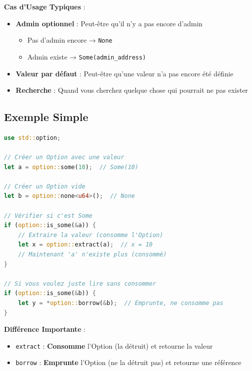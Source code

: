 \documentclass[11pt]{article}
\begin{document}
\begin{explainBox}
\textbf{Cas d'Usage Typiques} :
\begin{itemize}
  \item \textbf{Admin optionnel} : Peut-être qu'il n'y a pas encore d'admin
  \begin{itemize}
    \item Pas d'admin encore → \texttt{None}
    \item Admin existe → \texttt{Some(admin\_address)}
  \end{itemize}
  
  \item \textbf{Valeur par défaut} : Peut-être qu'une valeur n'a pas encore été définie
  \item \textbf{Recherche} : Quand vous cherchez quelque chose qui pourrait ne pas exister
\end{itemize}
\end{explainBox}

\subsection{Exemple Simple}

\begin{lstlisting}[language=Rust, caption=Utilisation Basique d'Option]
use std::option;

// Créer un Option avec une valeur
let a = option::some(10);  // Some(10)

// Créer un Option vide
let b = option::none<u64>();  // None

// Vérifier si c'est Some
if (option::is_some(&a)) {
    // Extraire la valeur (consomme l'Option)
    let x = option::extract(a);  // x = 10
    // Maintenant 'a' n'existe plus (consommé)
}

// Si vous voulez juste lire sans consommer
if (option::is_some(&b)) {
    let y = *option::borrow(&b);  // Emprunte, ne consomme pas
}
\end{lstlisting}

\begin{noteBox}
\textbf{Différence Importante} :
\begin{itemize}
  \item \texttt{extract} : \textbf{Consomme} l'Option (la détruit) et retourne la valeur
  \item \texttt{borrow} : \textbf{Emprunte} l'Option (ne la détruit pas) et retourne une référence
\end{itemize}
\end{noteBox}
\end{document}
